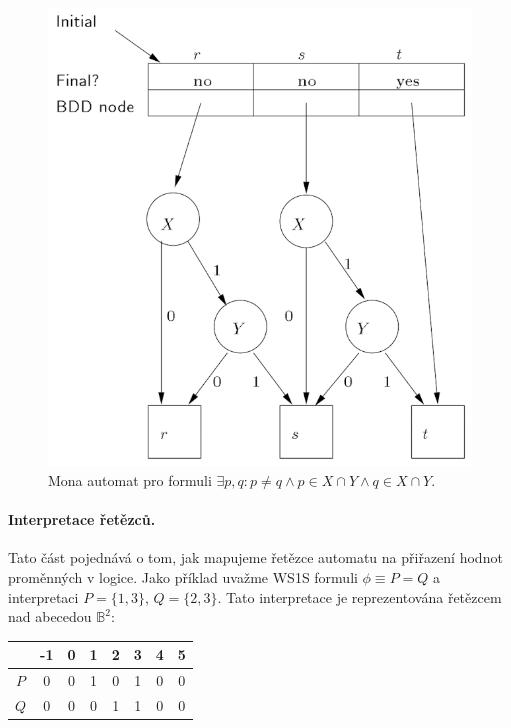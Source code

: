 \begin{figure}
    \centering
    \includegraphics[scale=0.5]{obrazky-figures/mona_aut.png}
    \caption{Mona automat pro formuli $\exists p,q: p \neq q \wedge p \in X \cap Y \wedge q \in X \cap Y $.}
    \label{mona_aut}
\end{figure}

\paragraph{Interpretace řetězců.} Tato část pojednává o tom, jak mapujeme řetězce automatu na přiřazení hodnot proměnných v logice. Jako příklad uvažme WS1S formuli $ \phi \equiv P = Q $ a interpretaci $ P = \{ 1,3 \} $, $ Q = \{ 2,3 \} $. Tato interpretace je reprezentována řetězcem nad abecedou $ \mathbb{B}^2$:

\begin{center}
    \begin{tabular}{ |c|c|c|c|c|c|c|c| } 
        \hline
          & -1 & 0 & 1 & 2 & 3 & 4 & 5 \\
        \hline
        $P$ & 0 & 0 & 1 & 0 & 1 & 0 & 0 \\ 
        $Q$ & 0 & 0 & 0 & 1 & 1 & 0 & 0 \\ 
        \hline
    \end{tabular}
\end{center}

